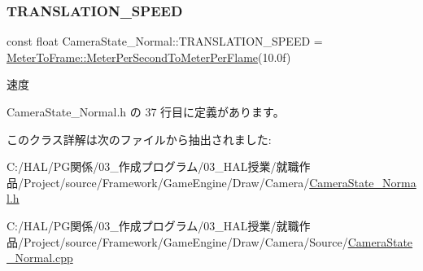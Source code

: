 \subsubsection{\texorpdfstring{T\+R\+A\+N\+S\+L\+A\+T\+I\+O\+N\+\_\+\+S\+P\+E\+ED}{TRANSLATION\_SPEED}}
{\footnotesize\ttfamily const float Camera\+State\+\_\+\+Normal\+::\+T\+R\+A\+N\+S\+L\+A\+T\+I\+O\+N\+\_\+\+S\+P\+E\+ED = \mbox{\hyperlink{class_meter_to_frame_aa5468938f59eb934bfc6a897a7513812}{Meter\+To\+Frame\+::\+Meter\+Per\+Second\+To\+Meter\+Per\+Flame}}(10.\+0f)\hspace{0.3cm}{\ttfamily [static]}}



速度 



 Camera\+State\+\_\+\+Normal.\+h の 37 行目に定義があります。



このクラス詳解は次のファイルから抽出されました\+:\begin{DoxyCompactItemize}
\item 
C\+:/\+H\+A\+L/\+P\+G関係/03\+\_\+作成プログラム/03\+\_\+\+H\+A\+L授業/就職作品/\+Project/source/\+Framework/\+Game\+Engine/\+Draw/\+Camera/\mbox{\hyperlink{_camera_state___normal_8h}{Camera\+State\+\_\+\+Normal.\+h}}\item 
C\+:/\+H\+A\+L/\+P\+G関係/03\+\_\+作成プログラム/03\+\_\+\+H\+A\+L授業/就職作品/\+Project/source/\+Framework/\+Game\+Engine/\+Draw/\+Camera/\+Source/\mbox{\hyperlink{_camera_state___normal_8cpp}{Camera\+State\+\_\+\+Normal.\+cpp}}\end{DoxyCompactItemize}
